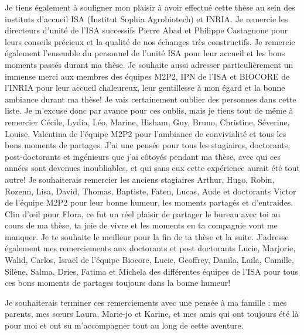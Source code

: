 
Je tiens également à souligner mon plaisir à avoir effectué cette thèse au sein des instituts d’accueil  ISA (Institut Sophia Agrobiotech)  et INRIA. Je remercie  les directeurs d’unité de l'ISA successifs Pierre Abad et Philippe
Castagnone   pour leurs conseils précieux et la qualité de nos  échanges très constructifs. 
Je remercie également l'ensemble du personnel de l'unité ISA pour leur accueil et les bons moments passés durant ma thèse. Je souhaite aussi adresser particulièrement un immense merci aux membres des équipes M2P2, IPN de l'ISA et BIOCORE de l'INRIA pour leur accueil chaleureux,  leur gentillesse à mon égard et la bonne ambiance durant ma thèse!  Je vais certainement oublier des personnes dans cette liste. Je m’excuse donc par avance pour ces
oublis, mais je tiens tout de même à remercier Cécile, Lydia, Léo, Marine, Hisham, Guy, Bruno, Christine, Séverine, Louise, Valentina de l'équipe M2P2  pour l'ambiance de convivialité et tous les bons moments de partages.
J'ai une pensée  pour tous les stagiaires, doctorants, post-doctorants et ingénieurs que j’ai côtoyés pendant ma thèse, avec qui ces années sont devenues inoubliables, et qui sans eux  cette expérience aurait été tout autre! Je souhaiterais remercier les anciens stagiaires Arthur, Hugo, Robin, Rozenn, Lisa, David, Thomas, Baptiste, Faten, Lucas, Aude  et  doctorants Victor  de l'équipe M2P2 pour leur bonne humeur, les moments partagés et d’entraides. Clin d’œil pour Flora, ce fut un réel plaisir de partager le bureau avec toi au cours de ma thèse, ta joie de vivre et les moments en ta compagnie vont me manquer. Je te souhaite le meilleur pour la fin de ta thèse et la suite. J'adresse également mes remerciements aux doctorants et post doctorants Lucie, Marjorie, Walid, Carlos, Israël de l’équipe Biocore, Lucie, Geoffrey, Danila, Laïla, Camille, Silène, Salma, Dries, Fatima et Michela des différentes équipes  de l'ISA pour tous ces bons moments de partages toujours dans la bonne humeur!


Je souhaiterais terminer ces remerciements avec une pensée  à ma famille : mes parents, mes sœurs Laura, Marie-jo et Karine, et mes amis  qui ont toujours été là pour moi et ont su m’accompagner  tout au long de cette aventure.